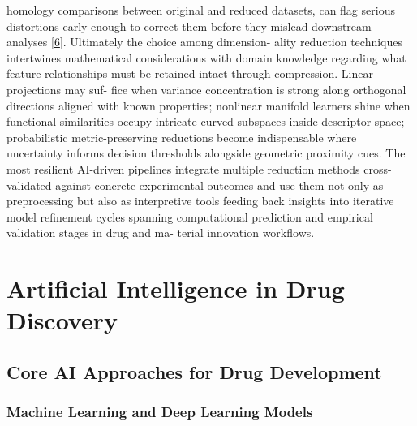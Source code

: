 \documentclass[
]{article}
\begin{document}
homology comparisons between original and reduced datasets, can flag
serious distortions early enough to correct them before they mislead
downstream analyses {[}\hyperref[_bookmark46]{6}{]}. Ultimately the
choice among dimension- ality reduction techniques intertwines
mathematical considerations with domain knowledge regarding what feature
relationships must be retained intact through compression. Linear
projections may suf- fice when variance concentration is strong along
orthogonal directions aligned with known properties; nonlinear manifold
learners shine when functional similarities occupy intricate curved
subspaces inside descriptor space; probabilistic metric-preserving
reductions become indispensable where uncertainty informs decision
thresholds alongside geometric proximity cues. The most resilient
AI-driven pipelines integrate multiple reduction methods cross-validated
against concrete experimental outcomes and use them not only as
preprocessing but also as interpretive tools feeding back insights into
iterative model refinement cycles spanning computational prediction and
empirical validation stages in drug and ma- terial innovation workflows.

\section{Artificial Intelligence in Drug
Discovery}\label{artificial-intelligence-in-drug-discovery}

\subsection{Core AI Approaches for Drug
Development}\label{core-ai-approaches-for-drug-development}

\subsubsection{Machine Learning and Deep Learning
Models}\label{machine-learning-and-deep-learning-models}
\end{document}
